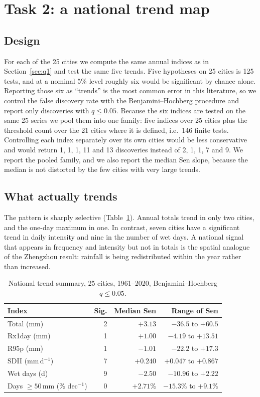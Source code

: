 \section{Task 2: a national trend map}\label{sec:q2}

\subsection{Design}

For each of the 25 cities we compute the same annual indices as in Section~\ref{sec:q1} and test the same five trends. Five hypotheses on 25 cities is 125 tests, and at a nominal 5\% level roughly six would be significant by chance alone. Reporting those six as ``trends'' is the most common error in this literature, so we control the false discovery rate with the Benjamini--Hochberg procedure \cite{bh1995} and report only discoveries with $q\le0.05$. Because the six indices are tested on the same 25 series we pool them into one family: five indices over 25 cities plus the threshold count over the 21 cities where it is defined, i.e.\ 146 finite tests. Controlling each index separately over its own cities would be less conservative and would return 1, 1, 1, 11 and 13 discoveries instead of 2, 1, 1, 7 and 9. We report the pooled family, and we also report the median Sen slope, because the median is not distorted by the few cities with very large trends.

\subsection{What actually trends}

The pattern is sharply selective (Table~\ref{tab:q2sig}). Annual totals trend in only two cities, and the one-day maximum in one. In contrast, seven cities have a significant trend in daily intensity and nine in the number of wet days. A national signal that appears in frequency and intensity but not in totals is the spatial analogue of the Zhengzhou result: rainfall is being redistributed within the year rather than increased.

\begin{table}[H]
\centering
\caption{National trend summary, 25 cities, 1961--2020, Benjamini--Hochberg $q\le0.05$.}
\label{tab:q2sig}
\footnotesize
\setlength{\tabcolsep}{4pt}
\begin{tabular}{lrrr}
\toprule
Index & Sig. & Median Sen & Range of Sen\\
\midrule
Total (mm) & 2 & $+3.13$ & $-36.5$ to $+60.5$\\
Rx1day (mm) & 1 & $+1.00$ & $-4.19$ to $+13.51$\\
R95p (mm) & 1 & $-1.01$ & $-22.2$ to $+17.3$\\
SDII (mm\,d$^{-1}$) & 7 & $+0.240$ & $+0.047$ to $+0.867$\\
Wet days (d) & 9 & $-2.50$ & $-10.96$ to $+2.22$\\
Days $\ge50$\,mm (\% dec$^{-1}$) & 0 & $+2.71\%$ & $-15.3\%$ to $+9.1\%$\\
\bottomrule
\end{tabular}
\end{table}

